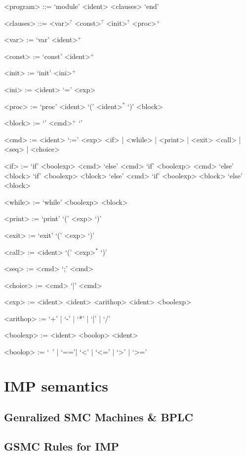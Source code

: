 \documentclass{llncs}%
\begin{document}
\begin{grammar}

<program> ::= `module' <ident> <clauses> `end'

<clauses> ::= <var>$^?$ <const>$^?$ <init>$^?$ <proc>$^+$

<var> := `var' <ident>$^+$ 

<const> := `const' <ident>$^+$ 

<init> := `init' <ini>$^+$

<ini> := <ident> `=' <exp>

<proc> := `proc' <ident> `(' <ident>$^*$ `)' <block>

<block> := `{' <cmd>$^+$ `}'

<cmd> := <ident> `:=' <exp> 
\alt <if> | <while> | <print> | <exit> 
\alt <call> |<seq> | <choice>

<if> := `if' <boolexp> <cmd> `else' <cmd> 
\alt `if' <boolexp> <cmd> `else' <block> 
\alt `if' <boolexp> <block> `else' <cmd> 
\alt `if' <boolexp> <block> `else' <block> 

<while> := `while' <boolexp> <block>

<print> := `print' `(' <exp> `)'

<exit> := `exit' `(' <exp> `)'

<call> := <ident> `(' <exp>$^*$ `)'

<seq> := <cmd> `;' <cmd>

<choice> := <cmd> `|' <cmd>

<exp> := <ident> 
\alt <ident> <arithop> <ident>
\alt <boolexp> 

<arithop> := `+' | `-' | `*' | `|' | `/'

<boolexp> := <ident> <boolop> <ident>

<boolop> := `~' | `=='| `<' | `<=' | `>' | `>=' 
\end{grammar}

\section{IMP semantics}

\subsection{Genralized SMC Machines \& BPLC}

\subsection{GSMC Rules for IMP}
\end{document}
